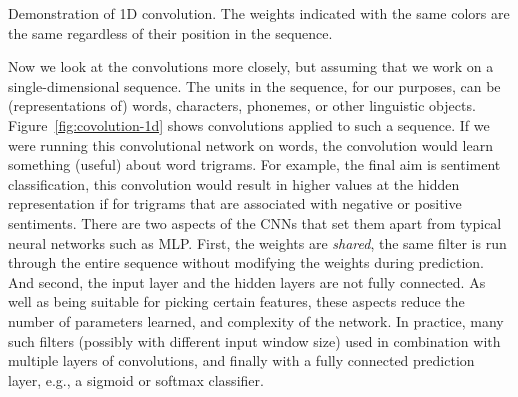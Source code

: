 \begin{marginfigure}
  \centering
  \tikzset{external/export next=false}
  \caption{Demonstration of  1D convolution.
    The weights indicated with the same colors are
    the same regardless of their position in the sequence.
  }
  \label{fig:covolution-1d}
\end{marginfigure}
Now we look at the convolutions more closely,
but assuming that we work on a single-dimensional sequence.
The units in the sequence, for our purposes,
can be (representations of) words, characters, phonemes,
or other linguistic objects.
Figure~\ref{fig:covolution-1d} shows convolutions applied to such a sequence.
If we were running this convolutional network on words,
the convolution would learn something (useful) about word trigrams.
For example, the final aim is sentiment classification,
this convolution would result in higher values at the hidden representation
if for trigrams that are associated with negative or positive sentiments.
There are two aspects of the CNNs that set them apart
from typical neural networks such as MLP.
First, the weights are \emph{shared},
the same filter is run through the entire sequence
without modifying the weights during prediction.
And second,
the input layer and the hidden layers are not fully connected.
As well as being suitable for picking certain features,
these aspects reduce the number of parameters learned,
and complexity of the network.
In practice, many such filters
(possibly with different input window size)
used in combination with multiple layers of convolutions,
and finally with a fully connected prediction layer,
e.g., a sigmoid or softmax classifier.

